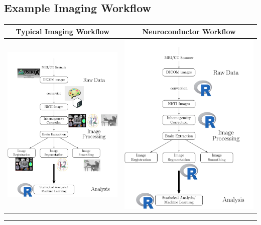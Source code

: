 \documentclass[final]{beamer}\usepackage[]{graphicx}\usepackage[]{color}
\begin{document}
\begin{frame}[fragile]
\begin{table}[!htb]
\begin{minipage}{0.40\linewidth}
\vspace{-0.5cm}
\section{Example Imaging Workflow}
\newcommand{\mywidth}{0.17}


\begin{center}
\setlength\arrayrulewidth{5pt}
\begin{tabular}{c|c}
\LARGE Typical Imaging Workflow & \LARGE Neuroconductor Workflow \\ \hline
\includegraphics[clip, width=0.5\linewidth]{figures/workflow_edited_nonR.png} &
\includegraphics[clip, width=0.5\linewidth]{figures/workflow_edited_R.png}
\end{tabular}
\end{center}

\vspace*{-0.25cm}
\noindent\rule{\linewidth}{5pt}


\end{minipage}
\end{table}
\end{frame}
\end{document}
